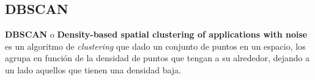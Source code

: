 \documentclass[a4paper, 12pt]{article}
\begin{document}
%
%
%
%
%
%


\subsection{DBSCAN}

\textbf{DBSCAN} o \textbf{Density-based spatial clustering of applications with noise} es un algoritmo de \textit{clustering} que dado un conjunto de puntos en un espacio, los agrupa en funci\'on de la densidad de puntos que tengan a su alrededor, dejando a un lado aquellos que tienen una densidad baja. \\
\end{document}
